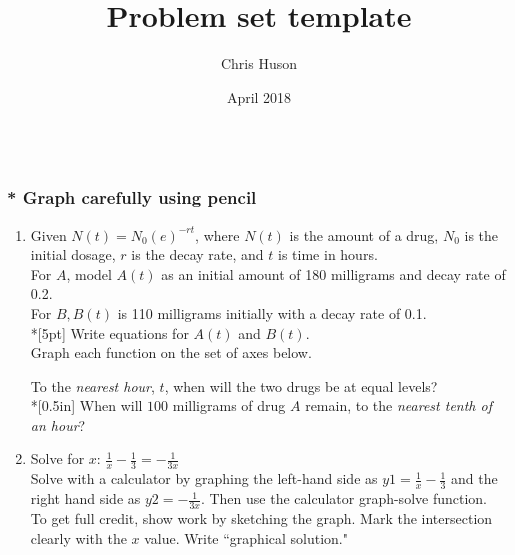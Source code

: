 \documentclass[12pt, oneside]{article}
\title{Problem set template}
\author{Chris Huson}
\date{April 2018}
\begin{document}

\subsubsection*{\\* \textnormal{Graph carefully using pencil}}

\begin{enumerate}

\item Given $N(t)=N_0(e)^{-rt}$, where $N(t)$ is the amount of a drug, $N_0$ is the initial dosage, $r$ is the decay rate, and $t$ is time in hours.\\[5pt] For $A$, model $A(t)$ as an initial amount of 180 milligrams and decay rate of 0.2.\\[5pt]
For $B, B(t)$ is 110 milligrams initially with a decay rate of 0.1.\\*[5pt]
Write equations for $A(t)$ and $B(t)$.\\[.75in]
Graph each function on the set of axes below.
\begin{center}
\end{center}
To the \emph{nearest hour}, $t$, when will the two drugs be at equal levels?\\*[0.5in]
When will $100$ milligrams of drug $A$ remain, to the \emph{nearest tenth of an hour}? 
\newpage

\item Solve for $x$: $\displaystyle \frac{1}{x} - \frac{1}{3} =-\frac{1}{3x}$\\[10pt]%
Solve with a calculator by graphing the left-hand side as $\displaystyle y1=\frac{1}{x} - \frac{1}{3}$ and the right hand side as $y2=-\frac{1}{3x}$. Then use the calculator graph-solve function.\\[1in]
To get full credit, show work by sketching the graph. Mark the intersection clearly with the $x$ value. Write ``graphical solution."
\begin{center}
\end{center}


\end{enumerate}
\end{document}
